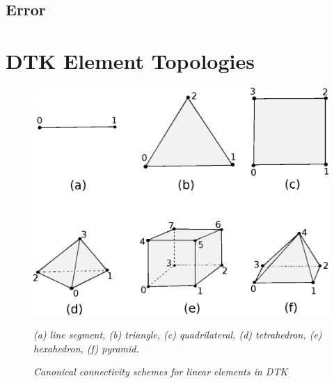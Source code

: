 \documentclass[letterpaper,12pt]{article}
\begin{document}
\subsection{Error}\label{subsec:error}

\clearpage




\clearpage

\appendix
\section{DTK Element Topologies}\label{apdx:cell_topo}

\begin{figure}[htpb!]
  \centering
  \includegraphics[width=5.5in]{Linear_Elements.eps}
  \caption{\sl Canonical connectivity schemes for linear elements in
    DTK}{\sl (a) line segment, (b) triangle, (c) quadrilateral, (d)
    tetrahedron, (e) hexahedron, (f) pyramid.}
  \label{fig:linear_elements}
\end{figure}

\clearpage

\end{document}
